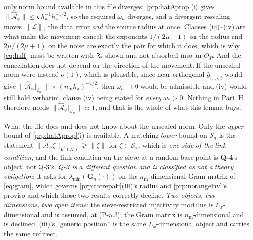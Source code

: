 \begin{lemma}
{only norm bound available in this file diverges}: \cref{prp:hatAprop}(i) gives
$\|\hat{\mathcal A}_\varphi\|\le\mathsf c\,h_u^{-1}h_x^{-1/2}$, so the required $\omega_n$ diverges,
and a divergent rescaling moves $\|\mathcal L\|$, the data error \emph{and} the source radius at once.
Clauses (iii)--(iv) are what make the movement cancel: the exponents $1/(2\mu+1)$ on the radius and
$2\mu/(2\mu+1)$ on the noise are exactly the pair for which it does, which is why \eqref{eq:linlf} must
be written with $\mathsf R_\ast$ shown and not absorbed into an $O_P$.
And the cancellation does not depend on the direction of the movement. If the unscaled norm were
instead $o(1)$, which is plausible, since near-orthogonal $\hat g_{\cdot,\cdot,\cdot,i}$ would give
$\|\hat{\mathcal A}_\varphi\vert_{\mathcal S_n}\|\asymp(n_{\mathrm m}h_u)^{-1/2}$, then
$\omega_n\to0$ would be admissible and (iv) would still hold verbatim, clause (iv) being stated for
\emph{every} $\omega_\ast>0$. Nothing in Part~H
therefore needs $\|\hat{\mathcal A}_\varphi\vert_{\mathcal S_n}\|\asymp1$, and that is the whole of what
this lemma buys.

What the file does and does not know about the unscaled norm. Only the \emph{upper} bound of
\cref{prp:hatAprop}(i) is
available. A matching \emph{lower} bound on $\mathcal S_n$ is the statement
$\|\hat{\mathcal A}_\varphi\zeta\|_{L^{2}(\Pi)}\gtrsim\|\zeta\|$ for $\zeta\in\mathcal S_n$, which is
\emph{one side of the link condition}, and the link condition on the sieve at a random base point is
\textbf{Q-4}'s object, not Q-3's. \emph{Q-3 is a different question and is classified as not a theory
obligation}: it asks for $\lambda_{\min}(\mathbf G_n(\cdot))$ on the $n_{\mathrm m}$-dimensional Gram
matrix of \eqref{eq:gram}, which governs \cref{prp:tccrepair}(iii)'s radius and
\cref{prp:norangeinv}'s proviso and which those two results correctly decline. \emph{Two objects, two
dimensions, two open items}: the sieve-restricted
injectivity modulus is $L_x$-dimensional and is assumed, at (P-a.3); the Gram matrix is
$n_{\mathrm m}$-dimensional and is declined. (iii)'s ``generic position'' is the
same $L_x$-dimensional object and carries the same redirect.


\end{lemma}
